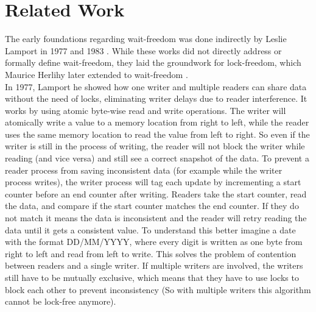 \chapter{Related Work}

The early foundations regarding wait-freedom was done indirectly by Leslie Lamport in 1977 and 1983 \cite{Lamport1977ConcurrentReading,Lamport1983SPSCCircularBuffer}. While these works did not directly address or formally define wait-freedom, they laid the groundwork for lock-freedom, which Maurice Herlihy later extended to wait-freedom \cite{herlihy1991wait}. \\
In 1977, Lamport he showed how one writer and multiple readers can share data without the need of locks, eliminating writer delays due to reader interference. It works by using atomic byte-wise read and write operations. The writer will atomically write a value to a memory location from right to left, while the reader uses the same memory location to read the value from left to right. So even if the writer is still in the process of writing, the reader will not block the writer while reading (and vice versa) and still see a correct snapshot of the data. To prevent a reader process from saving inconsistent data (for example while the writer process writes), the writer process will tag each update by incrementing a start counter before an end counter after writing. Readers take the start counter, read the data, and compare if the start counter matches the end counter. If they do not match it means the data is inconsistent and the reader will retry reading the data until it gets a consistent value. To understand this better imagine a date with the format DD/MM/YYYY, where every digit is written as one byte from right to left and read from left to write. This solves the problem of contention between readers and a single writer. If multiple writers are involved, the writers still have to be mutually exclusive, which means that they have to use locks to block each other to prevent inconsistency (So with multiple writers this algorithm cannot be lock-free anymore). \cite{Lamport1977ConcurrentReading} 

